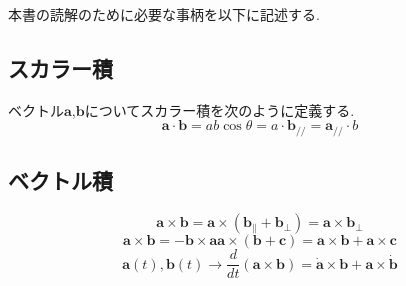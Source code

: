 \documentclass[dvipdfmx]{jsarticle}
\begin{document}
本書の読解のために必要な事柄を以下に記述する.

\subsection{スカラー積}
ベクトル$\bm{a}$,$\bm{b}$についてスカラー積を次のように定義する.
\[
	\bm{a} \cdot \bm{b} = ab \cos \theta = a \cdot \bm{b_{//}} = \bm{a_{//}} \cdot b
\]

\subsection{ベクトル積}
\[
\bm{a} \times \bm{b} = \bm{a} \times \left( \bm{b_{\parallel}} + \bm{b_{\perp}} \right) = \bm{a} \times \bm{b_{\perp}}
\]
\[
\bm{a} \times \bm{b} = - \bm{b} \times \bm{a}
\bm{a} \times \left( \bm{b} +\bm{c} \right )= \bm{a} \times \bm{b} +\bm{a} \times \bm{c}
\]
\[
\bm{a}(t), \bm{b}(t) \to \frac{d}{dt} ( \bm{a} \times \bm{b} )  =  \bm{\dot{a}} \times \bm{b} + \bm{a} \times \bm{\dot{b}}
\]
\end{document}
